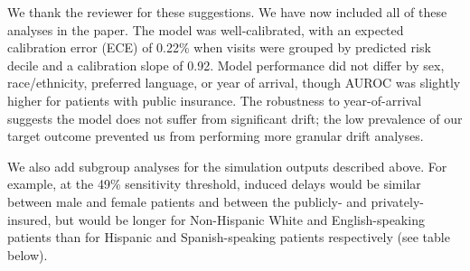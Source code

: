     We thank the reviewer for these suggestions. We have now included all of these analyses in the paper. The model was well-calibrated, with an expected calibration error (ECE) of 0.22\% when visits were grouped by predicted risk decile and a calibration slope of 0.92. Model performance did not differ by sex, race/ethnicity, preferred language, or year of arrival, though AUROC was slightly higher for patients with public insurance. The robustness to year-of-arrival suggests the model does not suffer from significant drift; the low prevalence of our target outcome prevented us from performing more granular drift analyses.

We also add subgroup analyses for the simulation outputs described above. For example, at the 49\% sensitivity threshold, induced delays would be similar between male and female patients and between the publicly- and privately-insured, but would be longer for Non-Hispanic White and English-speaking patients than for Hispanic and Spanish-speaking patients respectively (see table below).

